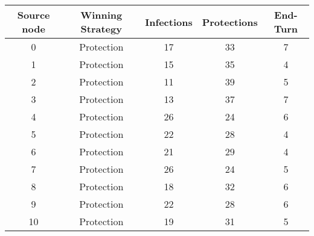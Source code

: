 \documentclass[results.tex]{subfiles}
\begin{document}
    \begin{center}
        \begin{tabular}{| c || c | c | c | c |}
            \hline
            {\bfseries Source node} & {\bfseries Winning Strategy} & {\bfseries Infections} & {\bfseries Protections}
            & {\bfseries End-Turn}
            \\  %
            \hline\hline
            0                       & Protection                   & 17                     & 33                      & 7                    \\
            \hline
            1                       & Protection                   & 15                     & 35                      & 4                    \\
            \hline
            2                       & Protection                   & 11                     & 39                      & 5                    \\
            \hline
            3                       & Protection                   & 13                     & 37                      & 7                    \\
            \hline
            4                       & Protection                   & 26                     & 24                      & 6                    \\
            \hline
            5                       & Protection                   & 22                     & 28                      & 4                    \\
            \hline
            6                       & Protection                   & 21                     & 29                      & 4                    \\
            \hline
            7                       & Protection                   & 26                     & 24                      & 5                    \\
            \hline
            8                       & Protection                   & 18                     & 32                      & 6                    \\
            \hline
            9                       & Protection                   & 22                     & 28                      & 6                    \\
            \hline
            10                      & Protection                   & 19                     & 31                      & 5                    \\

\end{tabular}
\end{center}
\end{document}
